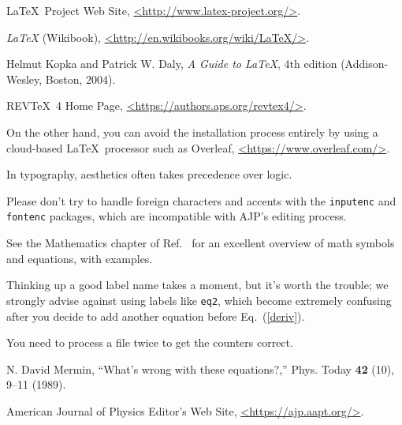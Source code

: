 \documentclass[prb,preprint]{revtex4-1}
\begin{document}
\begin{thebibliography}{99}

 \LaTeX\ Project Web Site, \url{<http://www.latex-project.org/>}.

 \textit{\LaTeX} (Wikibook), \url{<http://en.wikibooks.org/wiki/LaTeX/>}.

Helmut Kopka and Patrick W. Daly, \textit{A Guide to
\LaTeX}, 4th edition (Addison-Wesley, Boston, 2004).

 REV\TeX\ 4 Home Page, \url{<https://authors.aps.org/revtex4/>}.

 On the other hand, you can avoid the installation process
entirely by using a cloud-based \LaTeX\ processor such as Overleaf,
\url{<https://www.overleaf.com/>}.

 In typography, aesthetics often takes precedence over logic.

 Please don't try to handle foreign characters 
and accents with the \texttt{inputenc} and \texttt{fontenc} packages, which 
are incompatible with AJP's editing process.

 See the Mathematics chapter of Ref.~
for an excellent overview of math symbols and equations, with examples.

 Thinking up a good label name takes a moment, but 
it's worth the trouble; we strongly advise against using labels like 
\texttt{eq2}, which become extremely confusing after you decide to add 
another equation before Eq.~(\ref{deriv}).

 You need to process a file twice to get the counters correct.

 N. David Mermin, ``What's wrong with these equations?,'' 
Phys. Today \textbf{42} (10), 9--11 (1989).  

 American Journal of Physics Editor's Web Site, 
\url{<https://ajp.aapt.org/>}.


\end{thebibliography}
\end{document}
